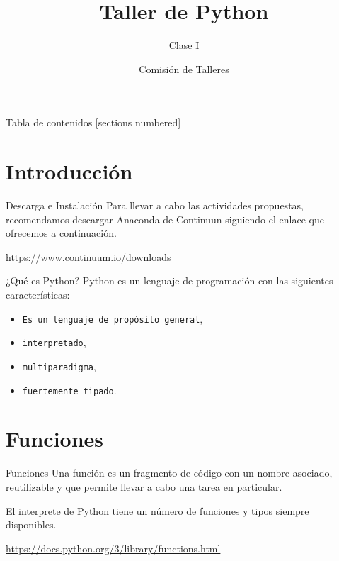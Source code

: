 \documentclass[10pt]{beamer}
\title{Taller de Python}
\subtitle{Clase I}
\date{}
\author{Comisión de Talleres}
\institute{Centro de Estudiantes Tecnológicos}
\begin{document}
\maketitle

\begin{frame}{Tabla de contenidos}
  [sections numbered]
  \tableofcontents[hideallsubsections]
\end{frame}

\section{Introducción}
\begin{frame}[fragile]{Descarga e Instalación}
Para llevar a cabo las actividades propuestas, recomendamos descargar \alert{Anaconda} de Continuun siguiendo el enlace que ofrecemos a continuación.
\vspace{1em}
\begin{center}
	\url{https://www.continuum.io/downloads}
\end{center}
\end{frame}

\begin{frame}{¿Qué es Python?}
Python es un \alert{lenguaje de programación} con las siguientes características:

\begin{itemize}[<+(1)- | alert@+>]
	\item \texttt{Es un lenguaje de propósito general},
	\item \texttt{interpretado},
	\item \texttt{multiparadigma},
	\item \texttt{fuertemente tipado}.
\end{itemize}

\begin{center}
\end{center}
\end{frame}

\section{Funciones}
\begin{frame}[fragile]{Funciones}
\alert{Una función es un fragmento de código con un nombre asociado, reutilizable y que permite llevar a cabo una tarea en particular.}

\vspace{1em}

El interprete de Python tiene un número de funciones y tipos siempre disponibles. 
	
\begin{center}
\url{https://docs.python.org/3/library/functions.html}
\end{center}
\end{frame}
\end{document}
